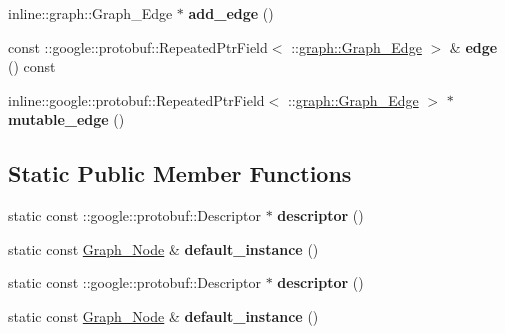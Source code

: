 \begin{DoxyCompactItemize}
\item 
\hypertarget{classgraph_1_1Graph__Node_a1217ffa590fdd95eab7d8f9d3b464b4a}{
inline::graph::Graph\_\-Edge $\ast$ {\bfseries add\_\-edge} ()}
\label{classgraph_1_1Graph__Node_a1217ffa590fdd95eab7d8f9d3b464b4a}

\item 
\hypertarget{classgraph_1_1Graph__Node_a39199d3d605e718a856c869eed3ba256}{
const ::google::protobuf::RepeatedPtrField$<$ ::\hyperlink{classgraph_1_1Graph__Edge}{graph::Graph\_\-Edge} $>$ \& {\bfseries edge} () const }
\label{classgraph_1_1Graph__Node_a39199d3d605e718a856c869eed3ba256}

\item 
\hypertarget{classgraph_1_1Graph__Node_a3ec630a7375b6c99d6a2808a5f9e430e}{
inline::google::protobuf::RepeatedPtrField$<$ ::\hyperlink{classgraph_1_1Graph__Edge}{graph::Graph\_\-Edge} $>$ $\ast$ {\bfseries mutable\_\-edge} ()}
\label{classgraph_1_1Graph__Node_a3ec630a7375b6c99d6a2808a5f9e430e}

\end{DoxyCompactItemize}
\subsection*{Static Public Member Functions}
\begin{DoxyCompactItemize}
\item 
\hypertarget{classgraph_1_1Graph__Node_a2a1ebf9c3fc400c7d650576338e3fa97}{
static const ::google::protobuf::Descriptor $\ast$ {\bfseries descriptor} ()}
\label{classgraph_1_1Graph__Node_a2a1ebf9c3fc400c7d650576338e3fa97}

\item 
\hypertarget{classgraph_1_1Graph__Node_a9cd51eafd2aadb24dc3af6ca9fd67051}{
static const \hyperlink{classgraph_1_1Graph__Node}{Graph\_\-Node} \& {\bfseries default\_\-instance} ()}
\label{classgraph_1_1Graph__Node_a9cd51eafd2aadb24dc3af6ca9fd67051}

\item 
\hypertarget{classgraph_1_1Graph__Node_a2a1ebf9c3fc400c7d650576338e3fa97}{
static const ::google::protobuf::Descriptor $\ast$ {\bfseries descriptor} ()}
\label{classgraph_1_1Graph__Node_a2a1ebf9c3fc400c7d650576338e3fa97}

\item 
\hypertarget{classgraph_1_1Graph__Node_a9cd51eafd2aadb24dc3af6ca9fd67051}{
static const \hyperlink{classgraph_1_1Graph__Node}{Graph\_\-Node} \& {\bfseries default\_\-instance} ()}
\label{classgraph_1_1Graph__Node_a9cd51eafd2aadb24dc3af6ca9fd67051}

\end{DoxyCompactItemize}
